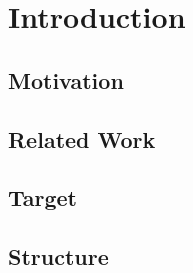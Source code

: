 \chapter{Introduction}\label{ch:introduction}

\section{Motivation}\label{sec:motivation}
\section{Related Work}\label{sec:related-work}
\section{Target}\label{sec:target}
\section{Structure}\label{sec:structure}

